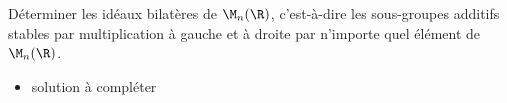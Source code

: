 \begin{enonce}
\begin{exercise}[ID={RMS134 E573},subtitle={Oral
    Mines-Ponts},theme={algebre},annee={2023},concours={mines-ponts},filiere={MP}, difficulty={0}]
Déterminer les idéaux bilatères de $\M_n(\R)$, c'est-à-dire les
sous-groupes additifs stables par multiplication à gauche et à droite
par n'importe quel élément de $\M_n(\R)$.
\end{exercise}
\begin{solution}
  \begin{itemize}
  \item solution à compléter
  \end{itemize}
\end{solution}
\end{enonce}